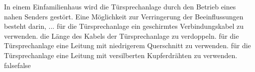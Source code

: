     {In einem Einfamilienhaus wird die Türsprechanlage durch den Betrieb eines nahen Senders gestört. Eine Möglichkeit zur Verringerung der Beeinflussungen besteht darin, ...}
    {für die Türsprechanlage ein geschirmtes Verbindungskabel zu verwenden.}
    {die Länge des Kabels der Türsprechanlage zu verdoppeln.}
    {für die Türsprechanlage eine Leitung mit niedrigerem Querschnitt zu verwenden.}
    {für die Türsprechanlage eine Leitung mit versilberten Kupferdrähten zu verwenden.}
    {false}{false}